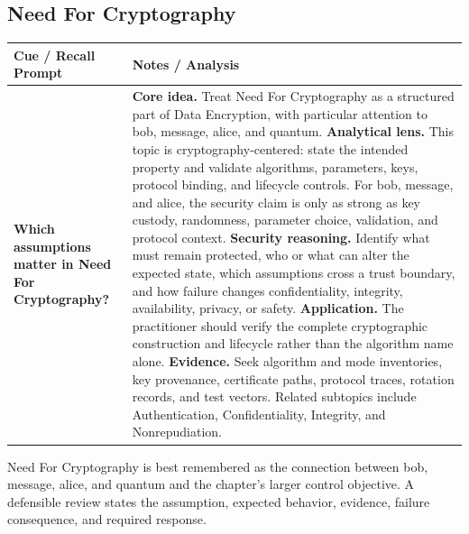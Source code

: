 \documentclass[11pt]{article}
\newcommand{\CornellHeader}{%
\rowcolor{Navy}\color{white}\bfseries Cue / Recall Prompt & \color{white}\bfseries Notes / Analysis\\\hline}
\newcommand{\CornellRow}[2]{%
\cellcolor{CueGray}\RaggedRight\textbf{#1} & \RaggedRight #2\\\hline}
\begin{document}
\subsection*{Need For Cryptography}
\begin{longtable}{>{\RaggedRight\arraybackslash}p{}|>{\RaggedRight\arraybackslash}p{}}
\CornellHeader
\CornellRow{Which assumptions matter in Need For Cryptography?}{\textbf{Core idea.} Treat Need For Cryptography as a structured part of Data Encryption, with particular attention to bob, message, alice, and quantum. \textbf{Analytical lens.} This topic is cryptography-centered: state the intended property and validate algorithms, parameters, keys, protocol binding, and lifecycle controls. For bob, message, and alice, the security claim is only as strong as key custody, randomness, parameter choice, validation, and protocol context. \textbf{Security reasoning.} Identify what must remain protected, who or what can alter the expected state, which assumptions cross a trust boundary, and how failure changes confidentiality, integrity, availability, privacy, or safety. \textbf{Application.} The practitioner should verify the complete cryptographic construction and lifecycle rather than the algorithm name alone. \textbf{Evidence.} Seek algorithm and mode inventories, key provenance, certificate paths, protocol traces, rotation records, and test vectors. Related subtopics include Authentication, Confidentiality, Integrity, and Nonrepudiation.}
\end{longtable}
\begin{topicsummary}
Need For Cryptography is best remembered as the connection between bob, message, alice, and quantum and the chapter's larger control objective. A defensible review states the assumption, expected behavior, evidence, failure consequence, and required response.
\end{topicsummary}
\end{document}
